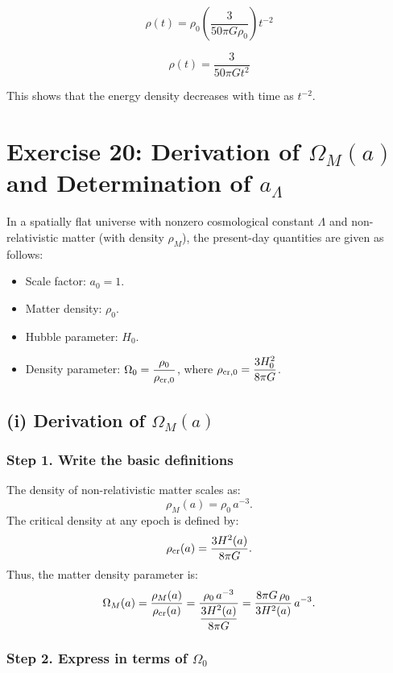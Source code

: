 \documentclass{article}
\begin{document}
\begin{equation}
\rho(t) = \rho_0 \left(\frac{3}{50\pi G \rho_0}\right) t^{-2}
\end{equation}

\begin{equation}
\rho(t) = \frac{3}{50\pi G t^2}
\end{equation}

This shows that the energy density decreases with time as $t^{-2}$.


\pagebreak

\section*{Exercise 20: Derivation of \(\Omega_M(a)\) and Determination of \(a_\Lambda\)}

In a spatially flat universe with nonzero cosmological constant \(\Lambda\) and non-relativistic matter (with density \(\rho_M\)), the present-day quantities are given as follows:
\begin{itemize}
  \item Scale factor: \(a_0=1\).
  \item Matter density: \(\rho_0\).
  \item Hubble parameter: \(H_0\).
  \item Density parameter: \(\Omega_0 = \dfrac{\rho_0}{\rho_{\rm cr,0}}\), where \(\rho_{\rm cr,0} = \dfrac{3H_0^2}{8\pi G}\).
\end{itemize}

\bigskip

\subsection*{(i) Derivation of \(\Omega_M(a)\)}

\subsubsection*{Step 1. Write the basic definitions}

The density of non-relativistic matter scales as:
\[
\rho_M(a) = \rho_0\,a^{-3}.
\]
The critical density at any epoch is defined by:
\[
\rho_{\rm cr}(a) = \frac{3H^2(a)}{8\pi G}.
\]
Thus, the matter density parameter is:
\[
\Omega_M(a) = \frac{\rho_M(a)}{\rho_{\rm cr}(a)} = \frac{\rho_0\,a^{-3}}{\dfrac{3H^2(a)}{8\pi G}}
= \frac{8\pi G\,\rho_0}{3H^2(a)}\,a^{-3}.
\]

\subsubsection*{Step 2. Express in terms of \(\Omega_0\)}
\end{document}
